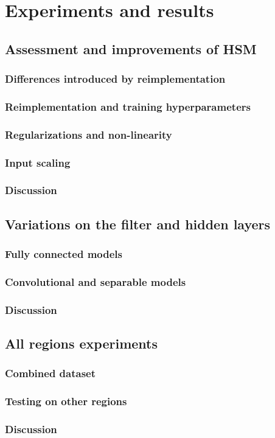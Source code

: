\chapter{Experiments and results}\label{ch:5}

\section{Assessment and improvements of HSM}

\subsection{Differences introduced by reimplementation}

\subsection{Reimplementation and training hyperparameters}

\subsection{Regularizations and non-linearity}

\subsection{Input scaling}

\subsection{Discussion}

\section{Variations on the filter and hidden layers}

\subsection{Fully connected models}

\subsection{Convolutional and separable models}

\subsection{Discussion}

\section{All regions experiments}

\subsection{Combined dataset}

\subsection{Testing on other regions}

\subsection{Discussion}
